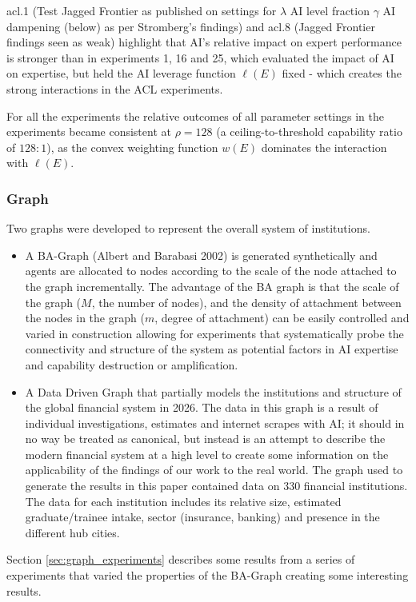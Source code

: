 \documentclass[11pt]{article}
\begin{document}
acl.1  (Test Jagged Frontier as published on settings for $\lambda$ AI level fraction $\gamma$ AI dampening (below) as per Stromberg's findings) and acl.8 (Jagged Frontier findings seen as weak) highlight that AI's relative impact on expert performance is stronger than in experiments 1, 16 and 25, which evaluated the impact of AI on expertise, but held the AI leverage function $\ell(E)$ fixed - which creates the strong interactions in the ACL experiments.

For all the experiments the relative outcomes of all parameter settings in the experiments became consistent at $\rho=128$ (a ceiling-to-threshold capability ratio of $128{:}1$), as the convex weighting function $w(E)$ dominates the interaction with $\ell(E)$.

\subsubsection{Graph} \label{sec:Graph}

Two graphs were developed to represent the overall system of institutions.
\begin{itemize}
  \item A BA-Graph (Albert and Barabasi 2002) is generated synthetically and agents are allocated to nodes according to the scale of the node attached to the graph incrementally. The advantage of the BA graph is that the scale of the graph ($M$, the number of nodes), and the density of attachment between the nodes in the graph ($m$, degree of attachment) can be easily controlled and varied in construction allowing for experiments that systematically probe the connectivity and structure of the system as potential factors in AI expertise and capability destruction or amplification. 
  \item A Data Driven Graph that partially models the institutions and structure of the global financial system in 2026.  The data in this graph is a result of individual investigations, estimates and internet scrapes with AI; it should in no way be treated as canonical, but instead is an attempt to describe the modern financial system at a high level to create some information on the applicability of the findings of our work to the real world. The graph used to generate the results in this paper contained data on 330 financial institutions. The data for each institution includes its relative size, estimated graduate/trainee intake, sector (insurance, banking) and presence in the different hub cities.
\end{itemize}
Section \ref{sec:graph_experiments} describes some results from a series of experiments that varied the properties of the BA-Graph creating some interesting results.
\end{document}
